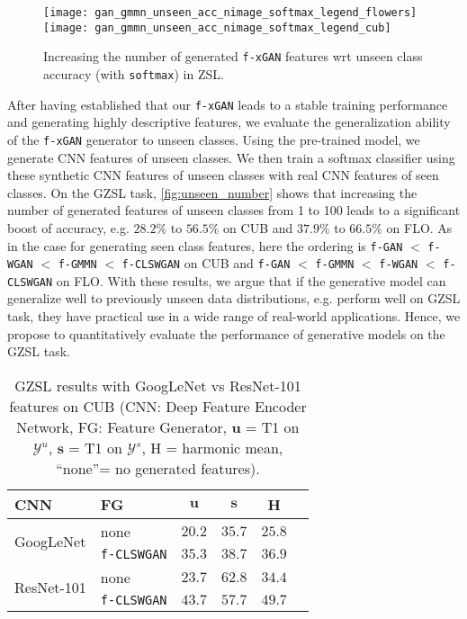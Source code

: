 \documentclass[10pt,twocolumn,letterpaper]{article}
\def\mthd{\texttt{f-xGAN}\xspace}
\begin{document}
\begin{figure}[t]
	\centering
            \texttt{[image: gan\_gmmn\_unseen\_acc\_nimage\_softmax\_legend\_flowers]}
		\texttt{[image: gan\_gmmn\_unseen\_acc\_nimage\_softmax\_legend\_cub]}
\caption{Increasing the number of generated \mthd features wrt unseen class accuracy (with \texttt{softmax}) in ZSL.}
	\label{fig:unseen_number}
\end{figure}

After having established that our \mthd leads to a stable training performance and generating highly descriptive features, 
we evaluate the generalization ability of the \mthd generator to unseen classes. Using the pre-trained model, we generate CNN features of unseen classes. We then train a softmax classifier using these synthetic CNN features of unseen classes with real CNN features of seen classes. On the GZSL task, \autoref{fig:unseen_number} shows that increasing the number of generated features of unseen classes from 1 to 100 leads to a significant boost of accuracy, e.g. $28.2\%$ to $56.5\%$ on CUB and $37.9\%$ to $66.5\%$ on FLO. As in the case for generating seen class features, here the ordering is \texttt{f-GAN} $<$ \texttt{f-WGAN} $<$ \texttt{f-GMMN} $<$ \texttt{f-CLSWGAN} on CUB and \texttt{f-GAN} $<$ \texttt{f-GMMN} $<$ \texttt{f-WGAN} $<$ \texttt{f-CLSWGAN} on FLO. With these results, we argue that if the generative model can generalize well to previously unseen data distributions, e.g. perform well on GZSL task, they have practical use in a wide range of real-world applications. Hence, we propose to quantitatively evaluate the performance of generative models on the GZSL task. 

{
\setlength{\tabcolsep}{5pt}
\renewcommand{\arraystretch}{1.2}
\begin{table}[t]
 \centering
   \begin{tabular}{l l c c c c }
CNN & FG & $\mathbf{u}$ & $\mathbf{s}$ & \textbf{H} \\ \hline
   \multirow{2}{*}{GoogLeNet} & none  & $20.2$ & $35.7$ & $25.8$ \\ & \texttt{f-CLSWGAN}  &  $35.3$ & $38.7$ & $36.9$   \\ \hline  
  \multirow{2}{*}{ResNet-101} & none  & $23.7$ & $62.8$ & $34.4$ \\ & \texttt{f-CLSWGAN}  &  $43.7$ & $57.7$ & $49.7$   \\ \end{tabular} 
\caption{GZSL results with GoogLeNet vs ResNet-101 features on CUB (CNN: Deep Feature Encoder Network, FG: Feature Generator, $\mathbf{u}$ = T1 on $\mathcal{Y}^{u}$, $\mathbf{s}$ = T1 on $\mathcal{Y}^{s}$, H = harmonic mean, ``none''= no generated features).
}
\label{tab:res_goog}
\end{table}
}
\end{document}
